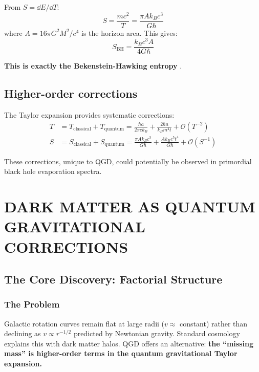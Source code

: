 \documentclass[11pt,a4paper]{article}
\theoremstyle{definition}
\theoremstyle{remark}
\begin{document}
	From $S = \dd E/\dd T$:
	\begin{equation}
		S = \frac{mc^2}{T} = \frac{\pi A k_B c^3}{G\hbar}
		\label{eq:entropy_derivation}
	\end{equation}
	where $A = 16\pi G^2 M^2/c^4$ is the horizon area. This gives:
	\begin{equation}
		\boxed{S_{\text{BH}} = \frac{k_B c^3 A}{4G\hbar}}
		\label{eq:bekenstein_hawking}
	\end{equation}
	
	\textbf{This is exactly the Bekenstein-Hawking entropy} \cite{Bekenstein1973}.
	
	\subsection{Higher-order corrections}
	
	The Taylor expansion provides systematic corrections:
	\begin{align}
		T &= T_{\text{classical}} + T_{\text{quantum}} = \frac{\hbar a}{2\pi c k_B} + \frac{2\hbar a}{k_B m^4 t} + \mathcal{O}(T^{-2}) \label{eq:T_correction} \\
		S &= S_{\text{classical}} + S_{\text{quantum}} = \frac{\pi A k_B c^3}{G\hbar} + \frac{A k_B c^5 t^4}{G\hbar} + \mathcal{O}(S^{-1}) \label{eq:S_correction}
	\end{align}
	
	These corrections, unique to QGD, could potentially be observed in primordial black hole evaporation spectra.
	
	\section{DARK MATTER AS QUANTUM GRAVITATIONAL CORRECTIONS}
	\label{sec:darkmatter}
	
	\subsection{The Core Discovery: Factorial Structure}
	
	\subsubsection{The Problem}
	
	Galactic rotation curves remain flat at large radii ($v \approx$ constant) rather than declining as $v \propto r^{-1/2}$ predicted by Newtonian gravity. Standard cosmology explains this with dark matter halos. QGD offers an alternative: \textbf{the ``missing mass'' is higher-order terms in the quantum gravitational Taylor expansion.}
	
\end{document}
